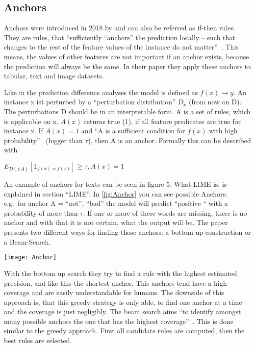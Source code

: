 \subsection{Anchors}
Anchors were introduced in 2018 by  and can also be referred as if-then rules. They are rules, that “sufficiently “anchors” the prediction locally – such that changes to the rest of the feature values of the instance do not matter”~\cite[1]{Ribeiro.2018}. This means, the values of other features are not important if an anchor exists, because the prediction will always be the same. In their paper they apply these anchors to tabular, text and image datasets.
\par
Like in the prediction difference analyses the model is defined as  
\(f(x) \rightarrow y\). 
An instance x ist perturbed by a “perturbation distribution” \(D_{x}\) (from now on D). The perturbations D should be in an interpretable form. A is a set of rules, which is applicable on x. \(A(x)\) returns true (1), if all feature predicates are true for instance x.
If 
\(A(x) = 1\)
 and “A is a sufficient condition for \(f(x)\) with high probability”~\cite[2]{Ribeiro.2018} (bigger than \(\tau\)), then A is an anchor. Formally this can be described with 
\par
\(E_{D(z|A)} [\mathbb{1}_{f(x)=f(z)}] ≥ \tau, A(x) = 1\)
 \par
An example of anchors for texts can be seen in figure 5. What LIME is, is explained in section “LIME”. In \cref{fig:Anchor} you can see possible Anchors: e.g.\ for anchor A = {“not”, “bad”} the model will predict “positive “ with a probability of more than \(\tau\). If one or more of these words are missing, there is no anchor and with that it is not certain, what the output will be.
The paper presents two different ways for finding those anchors: a bottom-up construction or a Beam-Search.
\begin{figure*}[h]
    \center
    \texttt{[image: Anchor]}
    \caption{possible Anchors for textual data~\cite{Ribeiro.2018}}
    \label{fig:Anchor}
\end{figure*}
\par
With the bottom up search they try to find a rule with the highest estimated precision, and like this the shortest anchor. This anchors tend have a high coverage and are easily understandable for humans. 
The downside of this approach is, that this greedy strategy is only able, to find one anchor at a time and the coverage is just negligibly.
The beam search aims “to identify amongst many possible anchors the one that has the highest coverage”~\cite[5]{Ribeiro.2018}. This is done similar to the greedy approach. First all candidate rules are computed, then the best rules are selected.


